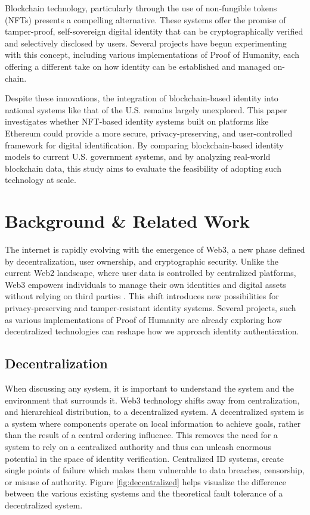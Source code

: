 \documentclass[conference]{IEEEtran}
\begin{document}
Blockchain technology, particularly through the use of non-fungible tokens (NFTs) presents a compelling alternative. These systems offer the promise of tamper-proof, self-sovereign digital identity that can be cryptographically verified and selectively disclosed by users. Several projects have begun experimenting with this concept, including various implementations of Proof of Humanity, each offering a different take on how identity can be established and managed on-chain.

Despite these innovations, the integration of blockchain-based identity into national systems like that of the U.S. remains largely unexplored. This paper investigates whether NFT-based identity systems built on platforms like Ethereum could provide a more secure, privacy-preserving, and user-controlled framework for digital identification. By comparing blockchain-based identity models to current U.S. government systems, and by analyzing real-world blockchain data, this study aims to evaluate the feasibility of adopting such technology at scale.


\section{Background \& Related Work}
The internet is rapidly evolving with the emergence of Web3, a new phase defined by decentralization, user ownership, and cryptographic security. Unlike the current Web2 landscape, where user data is controlled by centralized platforms, Web3 empowers individuals to manage their own identities and digital assets without relying on third parties \cite{what-is-web3}. This shift introduces new possibilities for privacy-preserving and tamper-resistant identity systems. Several projects, such as various implementations of Proof of Humanity are already exploring how decentralized technologies can reshape how we approach identity authentication.

\subsection{Decentralization}
When discussing any system, it is important to understand the system and the environment that surrounds it. Web3 technology shifts away from centralization, and hierarchical distribution, to a decentralized system. A decentralized system is a system where components operate on local information to achieve goals, rather than the result of a central ordering influence. This removes the need for a system to rely on a centralized authority and thus can unleash enormous potential in the space of identity verification. Centralized ID systems, create single points of failure which makes them vulnerable to data breaches, censorship, or misuse of authority. Figure \ref{fig:decentralized} helps visualize the difference between the various existing systems and the theoretical fault tolerance of a decentralized system.
\end{document}

